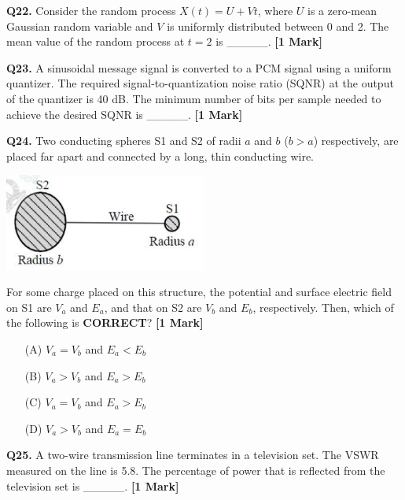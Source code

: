 \documentclass[11pt]{article}
\newcommand{\questiona}[2]{
    \noindent\textbf{Q#2.} #1 \hfill \textbf{[1 Mark]}
}
\begin{document}
\vspace{0.5cm}

\questiona{Consider the random process $X(t) = U + Vt$, where $U$ is a zero-mean Gaussian random variable and $V$ is uniformly distributed between 0 and 2. The mean value of the random process at $t = 2$ is \_\_\_\_\_.}{22}

\vspace{0.5cm}

\questiona{A sinusoidal message signal is converted to a PCM signal using a uniform quantizer. The required signal-to-quantization noise ratio (SQNR) at the output of the quantizer is 40 dB. The minimum number of bits per sample needed to achieve the desired SQNR is \_\_\_\_\_.}{23}

\vspace{0.5cm}

\questiona{Two conducting spheres S1 and S2 of radii $a$ and $b$ ($b > a$) respectively, are placed far apart and connected by a long, thin conducting wire.
\begin{center}
\includegraphics[width=0.5\textwidth]{figures/24.png}
\end{center}

For some charge placed on this structure, the potential and surface electric field on S1 are $V_a$ and $E_a$, and that on S2 are $V_b$ and $E_b$, respectively. Then, which of the following is \textbf{CORRECT}?}{24}
\begin{enumerate}
    \item[(A)] $V_a = V_b$ and $E_a < E_b$
    \item[(B)] $V_a > V_b$ and $E_a > E_b$
    \item[(C)] $V_a = V_b$ and $E_a > E_b$
    \item[(D)] $V_a > V_b$ and $E_a = E_b$
\end{enumerate}

\vspace{0.5cm}

\questiona{A two-wire transmission line terminates in a television set. The VSWR measured on the line is 5.8. The percentage of power that is reflected from the television set is \_\_\_\_\_.}{25}
\end{document}
